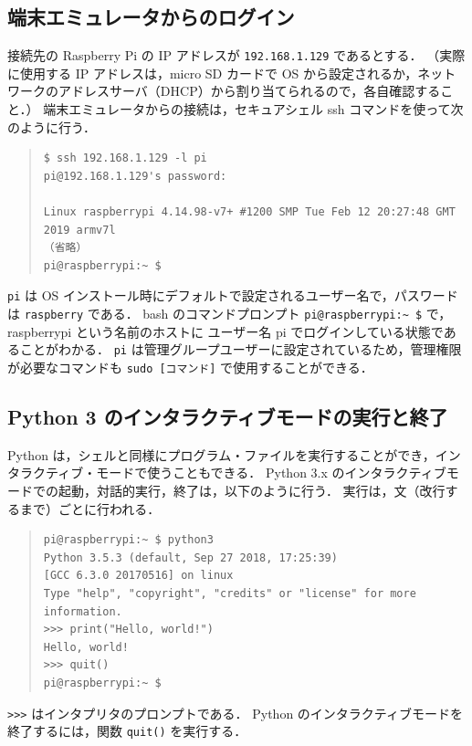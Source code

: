 \documentclass[11pt,a4,epsf]{article}
\begin{document}
\subsection{端末エミュレータからのログイン}

接続先の Raspberry Pi の IP アドレスが \verb+192.168.1.129+ であるとする．
（実際に使用する IP アドレスは，micro SD カードで OS から設定されるか，ネットワークのアドレスサーバ（DHCP）から割り当てられるので，各自確認すること．）
端末エミュレータからの接続は，セキュアシェル ssh コマンドを使って次のように行う．
\begin{quote}
\small
\begin{verbatim}
$ ssh 192.168.1.129 -l pi
pi@192.168.1.129's password: 

Linux raspberrypi 4.14.98-v7+ #1200 SMP Tue Feb 12 20:27:48 GMT 2019 armv7l
（省略）
pi@raspberrypi:~ $ 
\end{verbatim}
\end{quote}
\verb+pi+ は OS インストール時にデフォルトで設定されるユーザー名で，パスワードは \verb+raspberry+ である．
bash のコマンドプロンプト \verb+pi@raspberrypi:~ $+ で，raspberrypi という名前のホストに ユーザー名 pi でログインしている状態であることがわかる．
\verb+pi+ は管理グループユーザーに設定されているため，管理権限が必要なコマンドも \verb+sudo [コマンド]+ で使用することができる．

\subsection{Python 3 のインタラクティブモードの実行と終了}

Python は，シェルと同様にプログラム・ファイルを実行することができ，インタラクティブ・モードで使うこともできる．
Python 3.x のインタラクティブモードでの起動，対話的実行，終了は，以下のように行う．
実行は，文（改行するまで）ごとに行われる．
\begin{quote}
\small
\begin{verbatim}
pi@raspberrypi:~ $ python3
Python 3.5.3 (default, Sep 27 2018, 17:25:39) 
[GCC 6.3.0 20170516] on linux
Type "help", "copyright", "credits" or "license" for more information.
>>> print("Hello, world!")
Hello, world!
>>> quit()
pi@raspberrypi:~ $ 
\end{verbatim}
\end{quote}
\verb+>>>+ はインタプリタのプロンプトである．
Python のインタラクティブモードを終了するには，関数 \verb+quit()+ を実行する．
\end{document}
